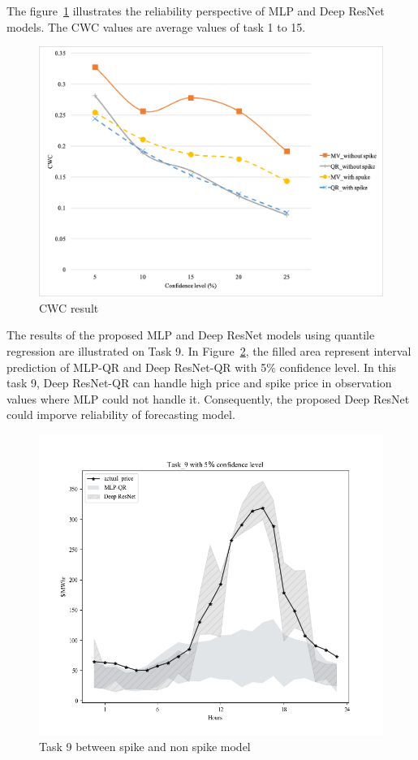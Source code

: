 \documentclass[review]{elsarticle}
\begin{document}
    The figure~\ref{Fig:CWC} illustrates the reliability perspective of MLP and Deep ResNet models. The CWC values are average values of task 1 to 15.
    \begin{figure}[H]
      \includegraphics[width=12cm]{CWC}
      \caption{CWC result}
      \label{Fig:CWC}
      \centering
    \end{figure}


    The results of the proposed MLP and Deep ResNet models using quantile regression are illustrated on Task 9. In Figure~\ref{Fig:compare_spike_and_non_spike_model}, the filled area represent interval prediction of MLP-QR and Deep ResNet-QR with 5$\%$ confidence level. In this task 9, Deep ResNet-QR can handle high price and spike price in observation values where MLP could not handle it. Consequently, the proposed Deep ResNet could imporve reliability of forecasting model.
    \begin{figure}[H]
      \includegraphics[width=12cm]{Task_9-compare_between_non-spike_and_spike}
      \caption{Task 9 between spike and non spike model}
      \label{Fig:compare_spike_and_non_spike_model}
      \centering
    \end{figure}
\end{document}
